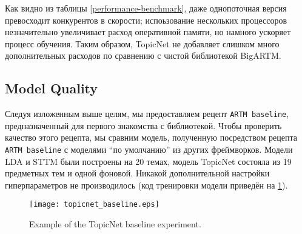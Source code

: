 Как видно из таблицы \ref{performance-benchmark}, даже однопоточная версия превосходит конкурентов в скорости; испоьзование нескольких процессоров незначительно увеличивает расход оперативной памяти, но намного ускоряет процесс обучения. Таким образом, TopicNet не добавляет слишком много дополнительных расходов по сравнению с чистой библиотекой BigARTM.

\subsection{Model Quality} 

Следуя изложенным выше целям, мы предоставляем рецепт \texttt{ARTM baseline}, предназначенный для первого знакомства с библиотекой. Чтобы проверить качество этого рецепта, мы сравним модель, полученную посредством рецепта \texttt{ARTM baseline} с моделями ``по умолчанию'' из других фреймворков. Модели LDA и STTM были построены на 20 темах, модель TopicNet состояла из 19 предметных тем и одной фоновой. Никакой дополнительной настройки гиперпараметров не производилось (код тренировки модели приведён на \ref{topicnet_baseline}). 



\begin{figure}[!ht]
    \centering
    \texttt{[image: topicnet\_baseline.eps]}
    \caption{Example of the TopicNet baseline experiment.}
\label{topicnet_baseline}
\end{figure}


